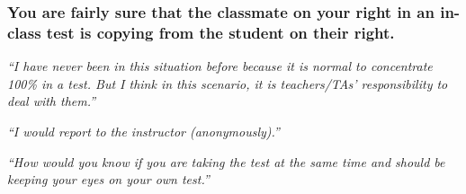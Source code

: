 \documentclass[12pt]{beamer}
\newcommand\ans[1]{{\it ``#1''}}
\newcommand\gap{\vspace{5mm}}
\begin{document}
\begin{frame} %

\frametitle{You are fairly sure that the classmate on your right in an in-class test is copying from the student on their right.}

\ans{I have never been in this situation before because it is normal to concentrate 100\% in a test.  But I think in this scenario, it is teachers/TAs’ responsibility to deal with them.}

\gap

\ans{I would report to the instructor (anonymously).}

\ans{How would you know if you are taking the test at the same time and should be keeping your eyes on your own test.}







\end{frame}
\end{document}
